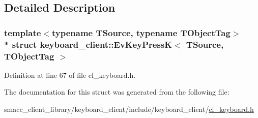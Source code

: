 \subsection{Detailed Description}
\subsubsection*{template$<$typename T\+Source, typename T\+Object\+Tag$>$\\*
struct keyboard\+\_\+client\+::\+Ev\+Key\+Press\+K$<$ T\+Source, T\+Object\+Tag $>$}



Definition at line 67 of file cl\+\_\+keyboard.\+h.



The documentation for this struct was generated from the following file\+:\begin{DoxyCompactItemize}
\item 
smacc\+\_\+client\+\_\+library/keyboard\+\_\+client/include/keyboard\+\_\+client/\hyperlink{cl__keyboard_8h}{cl\+\_\+keyboard.\+h}\end{DoxyCompactItemize}
